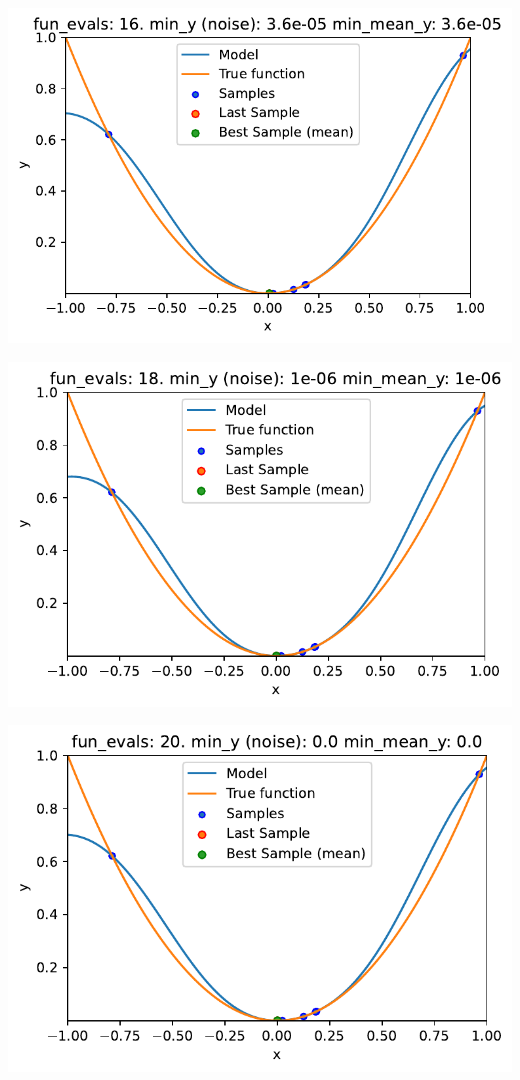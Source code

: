 \documentclass[
  letterpaper,
  DIV=11,
  numbers=noendperiod]{scrreprt}
\begin{document}
\includegraphics{013_num_spot_noisy_files/figure-pdf/cell-10-output-7.pdf}

\includegraphics{013_num_spot_noisy_files/figure-pdf/cell-10-output-8.pdf}

\includegraphics{013_num_spot_noisy_files/figure-pdf/cell-10-output-9.pdf}
\end{document}
